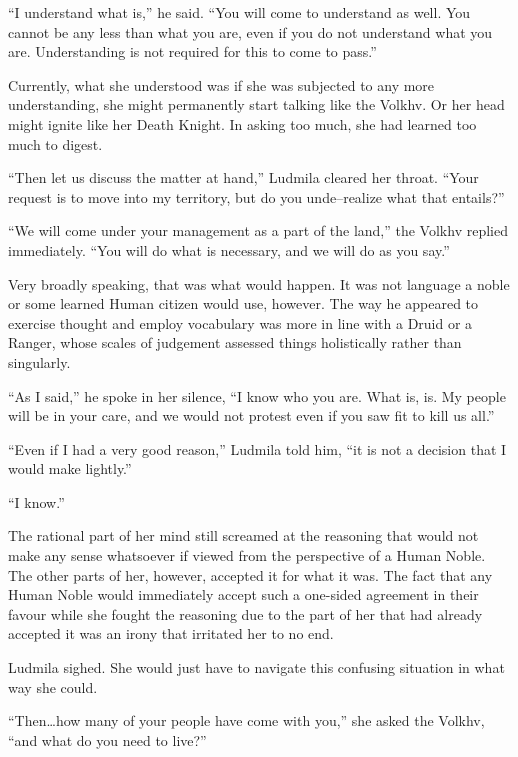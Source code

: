  

“I understand what is,” he said. “You will come to understand as well. You cannot be any less than what you are, even if you do not understand what you are. Understanding is not required for this to come to pass.”

 

Currently, what she understood was if she was subjected to any more understanding, she might permanently start talking like the Volkhv. Or her head might ignite like her Death Knight. In asking too much, she had learned too much to digest.

 

“Then let us discuss the matter at hand,” Ludmila cleared her throat. “Your request is to move into my territory, but do you unde–realize what that entails?”

 

“We will come under your management as a part of the land,” the Volkhv replied immediately. “You will do what is necessary, and we will do as you say.”

 

Very broadly speaking, that was what would happen. It was not language a noble or some learned Human citizen would use, however. The way he appeared to exercise thought and employ vocabulary was more in line with a Druid or a Ranger, whose scales of judgement assessed things holistically rather than singularly.

 

“As I said,” he spoke in her silence, “I know who you are. What is, is. My people will be in your care, and we would not protest even if you saw fit to kill us all.”

 

“Even if I had a very good reason,” Ludmila told him, “it is not a decision that I would make lightly.”

 

“I know.”

 

The rational part of her mind still screamed at the reasoning that would not make any sense whatsoever if viewed from the perspective of a Human Noble. The other parts of her, however, accepted it for what it was. The fact that any Human Noble would immediately accept such a one-sided agreement in their favour while she fought the reasoning due to the part of her that had already accepted it was an irony that irritated her to no end.

 

Ludmila sighed. She would just have to navigate this confusing situation in what way she could.

 

“Then…how many of your people have come with you,” she asked the Volkhv, “and what do you need to live?”

